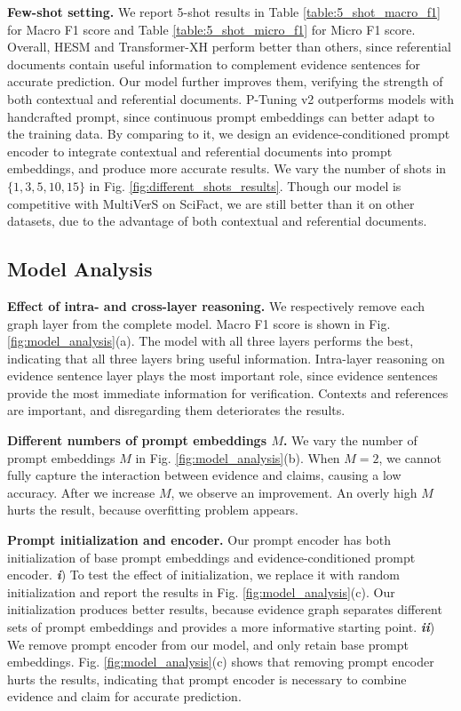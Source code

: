 \textbf{Few-shot setting.} We report 5-shot results in Table \ref{table:5_shot_macro_f1} for Macro F1 score and Table \ref{table:5_shot_micro_f1} for Micro F1 score. Overall, HESM and Transformer-XH perform better than others, since referential documents contain useful information to complement evidence sentences for accurate prediction. Our model further improves them, verifying the strength of both contextual and referential documents. P-Tuning v2 outperforms models with handcrafted prompt, since continuous prompt embeddings can better adapt to the training data. By comparing to it, we design an evidence-conditioned prompt encoder to integrate contextual and referential documents into prompt embeddings, and produce more accurate results. We vary the number of shots in $ \{1, 3, 5, 10, 15\} $ in Fig. \ref{fig:different_shots_results}. Though our model is competitive with MultiVerS on SciFact, we are still better than it on other datasets, due to the advantage of both contextual and referential documents.

\subsection{Model Analysis}

\textbf{Effect of intra- and cross-layer reasoning.} We respectively remove each graph layer from the complete model. Macro F1 score is shown in Fig. \ref{fig:model_analysis}(a). The model with all three layers performs the best, indicating that all three layers bring useful information. Intra-layer reasoning on evidence sentence layer plays the most important role, since evidence sentences provide the most immediate information for verification. Contexts and references are important, and disregarding them deteriorates the results.

\textbf{Different numbers of prompt embeddings $ M $.} We vary the number of prompt embeddings $ M $ in Fig. \ref{fig:model_analysis}(b). When $ M=2 $, we cannot fully capture the interaction between evidence and claims, causing a low accuracy. After we increase $ M $, we observe an improvement. An overly high $ M $ hurts the result, because overfitting problem appears.

\textbf{Prompt initialization and encoder.} Our prompt encoder has both initialization of base prompt embeddings and evidence-conditioned prompt encoder. \emph{\textbf{i}}) To test the effect of initialization, we replace it with random initialization and report the results in Fig. \ref{fig:model_analysis}(c). Our initialization produces better results, because evidence graph separates different sets of prompt embeddings and provides a more informative starting point. \emph{\textbf{ii}}) We remove prompt encoder from our model, and only retain base prompt embeddings. Fig. \ref{fig:model_analysis}(c) shows that removing prompt encoder hurts the results, indicating that prompt encoder is necessary to combine evidence and claim for accurate prediction.

